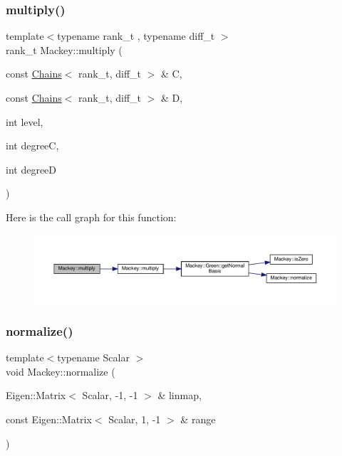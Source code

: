 \subsubsection{\texorpdfstring{multiply()}{multiply()}\hspace{0.1cm}{\footnotesize\ttfamily [2/2]}}
{\footnotesize\ttfamily template$<$typename rank\+\_\+t , typename diff\+\_\+t $>$ \\
rank\+\_\+t Mackey\+::multiply (\begin{DoxyParamCaption}\item[{const \hyperlink{classMackey_1_1Chains}{Chains}$<$ rank\+\_\+t, diff\+\_\+t $>$ \&}]{C,  }\item[{const \hyperlink{classMackey_1_1Chains}{Chains}$<$ rank\+\_\+t, diff\+\_\+t $>$ \&}]{D,  }\item[{int}]{level,  }\item[{int}]{degreeC,  }\item[{int}]{degreeD }\end{DoxyParamCaption})}

Here is the call graph for this function\+:\nopagebreak
\begin{figure}[H]
\begin{center}
\leavevmode
\includegraphics[width=350pt]{namespaceMackey_a2eca4cc709501ad3fc20b82fe4bcbd33_cgraph}
\end{center}
\end{figure}
\mbox{\label{namespaceMackey_a40d5c8d3e43cd2ee3df09664bc8c56ea}} 
\subsubsection{\texorpdfstring{normalize()}{normalize()}\hspace{0.1cm}{\footnotesize\ttfamily [1/2]}}
{\footnotesize\ttfamily template$<$typename Scalar $>$ \\
void Mackey\+::normalize (\begin{DoxyParamCaption}\item[{Eigen\+::\+Matrix$<$ Scalar, -\/1, -\/1 $>$ \&}]{linmap,  }\item[{const Eigen\+::\+Matrix$<$ Scalar, 1, -\/1 $>$ \&}]{range }\end{DoxyParamCaption})}




